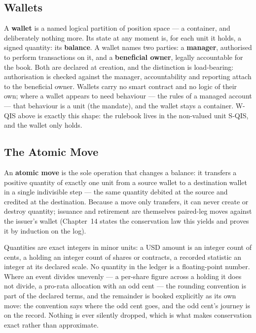 \subsection{Wallets}

A \textbf{wallet} is a named logical partition of position space --- a container, and
deliberately nothing more. Its state at any moment is, for each unit it holds, a signed
quantity: its \textbf{balance}. A wallet names two parties: a \textbf{manager},
authorised to perform transactions on it, and a \textbf{beneficial owner}, legally
accountable for the book. Both are declared at creation, and the distinction is
load-bearing: authorisation is checked against the manager, accountability and reporting
attach to the beneficial owner. Wallets carry no smart contract and no logic of their
own; where a wallet appears to need behaviour --- the rules of a managed account ---
that behaviour is a unit (the mandate), and the wallet stays a container. W-QIS above is
exactly this shape: the rulebook lives in the non-valued unit S-QIS, and the wallet only
holds.

\subsection{The Atomic Move}

An \textbf{atomic move} is the sole operation that changes a balance: it transfers a
positive quantity of exactly one unit from a source wallet to a destination wallet in a
single indivisible step --- the same quantity debited at the source and credited at the
destination. Because a move only transfers, it can never create or destroy quantity;
issuance and retirement are themselves paired-leg moves against the issuer's wallet
(Chapter~14 states the conservation law this yields and proves it by induction on the
log).

Quantities are exact integers in minor units: a USD amount is an integer count of cents,
a holding an integer count of shares or contracts, a recorded statistic an integer at
its declared scale. No quantity in the ledger is a floating-point number. Where an event
divides unevenly --- a per-share figure across a holding it does not divide, a pro-rata
allocation with an odd cent --- the rounding convention is part of the declared terms,
and the remainder is booked explicitly as its own move: the convention says where the
odd cent goes, and the odd cent's journey is on the record. Nothing is ever silently
dropped, which is what makes conservation exact rather than approximate.

